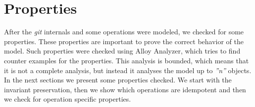 \chapter{Properties}
After the \emph{git} internals and some operations were modeled,
we checked for some properties. These properties are important to
prove the correct behavior of the model. Such properties were checked using
Alloy Analyzer, which tries to find counter examples for the
properties. This analysis is bounded, which means that it is not a
complete analysis, but instead it analyses the model up to
\emph{''n''} objects.\\

In the next sections we present some properties checked. We start with
the invariant preservation, then we show which operations are
idempotent and then we check for operation specific properties.
